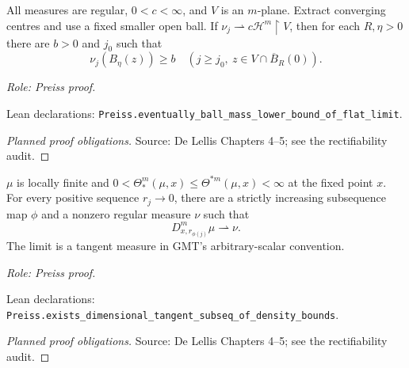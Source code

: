\begin{lemma}
\label{lem:flat-limit-moving-balls}







All measures are regular, \(0<c<\infty\), and \(V\) is an \(m\)-plane. Extract converging centres and use a fixed smaller open ball.
If \(\nu_j\rightharpoonup c\mathcal H^m\!\restriction V\), then for each \(R,\eta>0\) there are \(b>0\) and \(j_0\) such that
\[
 \nu_j(B_\eta(z))\geq b
 \quad(j\geq j_0,\ z\in V\cap\overline B_R(0)).
\]
\par\emph{Role: Preiss proof.}
\par Lean declarations: \texttt{Preiss.eventually\_ball\_mass\_lower\_bound\_of\_flat\_limit}.
\end{lemma}
\begin{proof}[Planned proof obligations]

\par Source: De Lellis Chapters 4--5; see the rectifiability audit.
\end{proof}

\begin{lemma}
\label{lem:dimensional-compactness}







\(\mu\) is locally finite and \(0<\Theta_*^m(\mu,x)\leq\Theta^{*m}(\mu,x)<\infty\) at the fixed point \(x\).
For every positive sequence \(r_j\to0\), there are a strictly increasing subsequence map \(\phi\) and a nonzero regular measure \(\nu\) such that
\[
 D^m_{x,r_{\phi(j)}}\mu\rightharpoonup\nu.
\]
The limit is a tangent measure in GMT's arbitrary-scalar convention.
\par\emph{Role: Preiss proof.}
\par Lean declarations: \texttt{Preiss.exists\_dimensional\_tangent\_subseq\_of\_density\_bounds}.
\end{lemma}
\begin{proof}[Planned proof obligations]

\par Source: De Lellis Chapters 4--5; see the rectifiability audit.
\end{proof}

